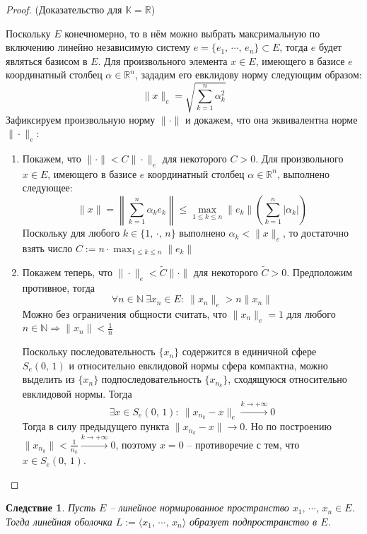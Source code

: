 \documentclass[a4paper,12pt]{article}
\renewcommand{\leq}{\ensuremath{\leqslant}}
\theoremstyle{plain}
\newtheorem*{corollary}{Следствие}
\theoremstyle{definition}
\theoremstyle{remark}
\begin{document}
\begin{proof}
	(Доказательство для $\mathbb{K} = \mathbb{R}$)

	Поскольку $E$ конечномерно, то в нём можно выбрать максримальную по включению линейно независимую систему $e = \{e_1,\,\cdots,\,e_n\} \subset E$, тогда $e$ будет являться базисом в $E$. Для произвольного элемента $x \in E$, имеющего в базисе $e$ координатный столбец $\alpha \in \mathbb{R}^n$, зададим его евклидову норму следующим образом:
	\[
		\|x\|_e = \sqrt{\sum_{k = 1}^n \alpha_k^2}
	\]
	Зафиксируем произвольную норму $\|\cdot\|$ и докажем, что она эквивалентна норме $\|\cdot\|_e$:
	\begin{enumerate}
		\item Покажем, что $\|\cdot\| < C\|\cdot\|_e$ для некоторого $C > 0$. Для произвольного $x \in E$, имеющего в базисе $e$ координатный столбец $\alpha \in \mathbb{R}^n$, выполнено следующее:
		      \[
			      \|x\| = \left\|\sum_{k = 1}^n \alpha_ke_k\right\| \leq \max_{1 \leq k \leq n}\|e_k\| \left(\sum_{k = 1}^n \vert \alpha_k\vert\right)
		      \]
		      Поскольку для любого $k \in \{1,\, \cdot,\,n\}$ выполнено $\alpha_k < \|x\|_e$, то достаточно взять число $C := n\cdot\max_{1\leq k\leq n}\|e_k\|$
		\item Покажем теперь, что $\|\cdot\|_e < \tilde{C}\|\cdot\|$ для некоторого $\tilde{C} > 0$. Предположим противное, тогда
		      \[
			      \forall n \in \mathbb{N} \: \exists x_n \in E :\: \|x_n\|_e > n\|x_n\|
		      \]
		      Можно без ограничения общности считать, что $\|x_n\|_e = 1$ для любого $n \in \mathbb{N} \Rightarrow \|x_n\| < \frac{1}{n}$

		      Поскольку последовательность $\{x_n\}$ содержится в единичной сфере $S_e(0,\,1)$ и относительно евклидовой нормы сфера компактна, можно выделить из $\{x_n\}$ подпоследовательность $\{x_{n_k}\}$, сходящуюся относительно евклидовой нормы. Тогда
		      \[
			      \exists x \in S_e(0,\,1) :\: \|x_{n_k} - x\|_e \overset{k \to +\infty}{\to} 0
		      \]
		      Тогда в силу предыдущего пункта $\|x_{n_k} - x\| \to 0$. Но по построению $\|x_{n_k}\| < \frac{1}{n_k} \overset{k \to +\infty}{\to} 0$, поэтому $x = 0$ -- противоречие с тем, что $x \in S_e(0,\,1)$.
	\end{enumerate}
\end{proof}

\begin{corollary}
	Пусть $E$ -- линейное нормированное пространство $x_1,\,\cdots,\,x_n \in E$. Тогда линейная оболочка $L := \langle x_1,\,\cdots,\, x_n\rangle$ образует подпространство в $E$.
\end{corollary}
\end{document}

